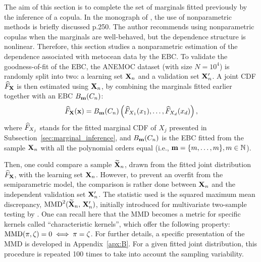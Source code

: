 The aim of this section is to complete the set of marginals fitted previously by the inference of a copula. 
In the monograph of \citet{joe2011dependence}, the use of nonparametric methods is briefly discussed p.250. 
The author recommends using nonparametric copulas when the marginals are well-behaved, but the dependence structure is nonlinear. 
Therefore, this section studies a nonparametric estimation of the dependence associated with metocean data by the EBC. 
To validate the goodness-of-fit of the EBC, the ANEMOC dataset (with size $N=10^4$) is randomly split into two: a learning set ${\bf X}_n$ and a validation set ${\bf X}_n'$. 
A joint CDF $\widehat{F}_{\bf X}$ is then estimated using ${\bf X}_n$, by combining the marginals fitted earlier together with an EBC $B_{{\bf m}}(C_n)$: 
\begin{equation}
    \widehat{F}_{\bf X}({\bf x}) = B_{{\bf m}}(C_n)\left(\widehat{F}_{X_1}(x_1), \dots, \widehat{F}_{X_d}(x_d)\right),
\end{equation}
where $\widehat{F}_{X_j}$ stands for the fitted marginal CDF of $X_j$ presented in Subsection~\ref{sec:marginal_inference}, 
and $B_{{\bf m}}(C_n)$ is the EBC fitted from the sample ${\bf X}_n$ with all the polynomial orders equal (i.e., ${\bf m} = \{m, \dots, m\}, m\in\mathbb{N}$).

Then, one could compare a sample $\widetilde{{\bf X}}_n$, drawn from the fitted joint distribution $\widehat{F}_{\bf X}$, with the learning set ${\bf X}_n$. 
However, to prevent an overfit from the semiparametric model, the comparison is rather done between ${\bf X}_n$ and the independent validation set ${\bf X}_n'$. 
The statistic used is the squared maximum mean discrepancy, $\mathrm{MMD}^2(\widetilde{{\bf X}}_n, \, {\bf X}_n')$, initially introduced for multivariate two-sample testing by \cite{gretton_2006}. 
One can recall here that the MMD becomes a metric for specific kernels called “characteristic kernels”, which offer the following property: $\mathrm{MMD}(\pi, \zeta)=0 \iff \pi = \zeta$. 
For further details, a specific presentation of the MMD is developed in Appendix~\ref{apx:B}. 
For a given fitted joint distribution, this procedure is repeated 100 times to take into account the sampling variability. 

